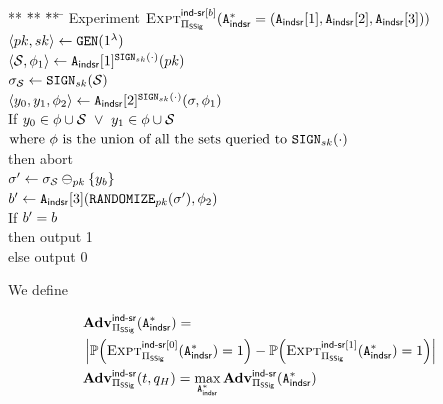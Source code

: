 \begin{center}
	\begin{minipage}[t]{0.95\columnwidth}
		\begin{tabbing}
			** \= ** \= ** \=\kill
			Experiment $\Experiment{\indsrLabel[\indBit]}{\sigScheme}(\indsrAdversaryCombDefn)$ \\
			\> $\langle \pubKey, \privKey \rangle \gets \keyGen(1^{\secParam})$ \\
			\> $\tupleDefn{\genericSetVar, \adversaryState{1}} \gets 
			\indsrAdversary{1}^{\signingAlg[\privKey](\cdot)}(\pubKey)$  \\
			\> $\genericSig[\genericSetVar]  \gets \signingAlg[\privKey](\genericSetVar)$ \\
			\> $\tupleDefn{\genericCInputElmt{0}, \genericCInputElmt{1}, 
			\adversaryState{2} } 
			\gets  
			\indsrAdversary{2}^{\signingAlg[\privKey](\cdot)}(\genericSig, \adversaryState{1})$  \\
			\> If $\genericCInputElmt{0} \in \queriedSets \cup \genericSetVar ~\lor~
			\genericCInputElmt{1} \in \queriedSets \cup \genericSetVar$\\
			\> \> $\mbox{where $\queriedSets$ is the 
				union of all the sets queried to $\signingAlg[\privKey](\cdot)$ }$ \\
			\> \> \> then abort \\
			\> $\genericSigAlt \gets \genericSig[\genericSetVar] \sigMinus[\pubKey] 
			\{\genericCInputElmt{\indBit}\}$ \\
			\> $\advBit \gets 
			\indsrAdversary{3}(\randomize[\pubKey](\genericSigAlt), \adversaryState{2})$ \\
			
			\> If $b' = b$ \\
			\> \> then output 1 \\
			\> \> else output 0
		\end{tabbing}
	\end{minipage}
\end{center}



We define

\begin{eqnarray*}
	& \Advantage{\indsrLabel}{\sigScheme}(\indsrAdversaryComb) = \\
	&  \left|	\prob{\Experiment{\indsrLabel[0]}{\sigScheme}(\indsrAdversaryComb) = 1} - 
	\prob{\Experiment{\indsrLabel[1]}{\sigScheme}(\indsrAdversaryComb) = 1} \right| \\
	& \Advantage{\indsrLabel}{\sigScheme}(\timeBound, \oracleQueries) = 
	\max_{\indsrAdversaryComb} 
	\Advantage{\indsrLabel}{\sigScheme}(\indsrAdversaryComb) 
\end{eqnarray*}



